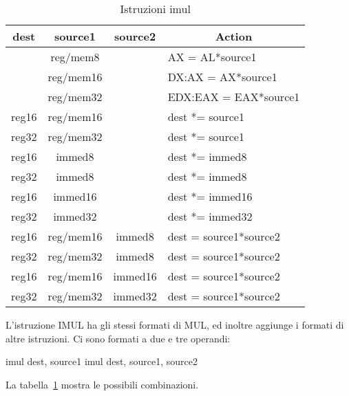 \begin{table}[t]
\centering
\begin{tabular}{|c|c|c|l|}
\hline
{ \bf dest} & { \bf source1 } & {\bf source2} & \multicolumn{1}{c|}{\bf Action} \\ \hline
            & reg/mem8        &               & AX = AL*source1 \\
            & reg/mem16       &               & DX:AX = AX*source1 \\
            & reg/mem32       &               & EDX:EAX = EAX*source1 \\
reg16       & reg/mem16       &               & dest *= source1 \\
reg32       & reg/mem32       &               & dest *= source1 \\
reg16       & immed8          &               & dest *= immed8 \\
reg32       & immed8          &               & dest *= immed8 \\
reg16       & immed16         &               & dest *= immed16 \\
reg32       & immed32         &               & dest *= immed32 \\
reg16       & reg/mem16       & immed8        & dest = source1*source2 \\
reg32       & reg/mem32       & immed8        & dest = source1*source2 \\
reg16       & reg/mem16       & immed16       & dest = source1*source2 \\
reg32       & reg/mem32       & immed32       & dest = source1*source2 \\
\hline
\end{tabular}
\caption{Istruzioni {\code imul} \label{tab:imul}}
\end{table}

L'istruzione {\code IMUL} ha gli stessi formati di {\code MUL}, ed
inoltre aggiunge i formati di altre istruzioni. Ci sono formati a due
e tre operandi: 
\begin{AsmCodeListing}[numbers=none,frame=none]
      imul   dest, source1
      imul   dest, source1, source2
\end{AsmCodeListing}
La tabella~\ref{tab:imul} mostra le possibili combinazioni.

